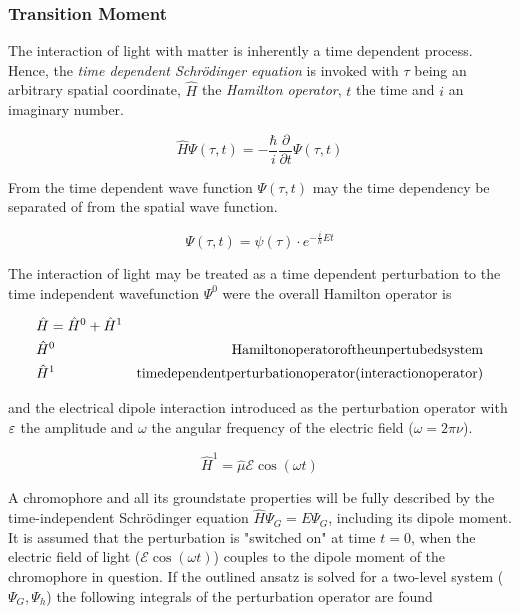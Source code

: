 			\subsubsection{Transition Moment}
			The interaction of light with matter is inherently a time dependent process. Hence, the \emph{time dependent Schrödinger equation} is invoked with $\tau$ being an arbitrary spatial coordinate, $\hat{H}$ the \emph{Hamilton operator}, $t$ the time and $i$ an imaginary number.

			\begin{equation}
				\hat{H}\Psi(\tau, t) = -\frac{\hbar}{i}\frac{\partial}{\partial t}\Psi(\tau, t)
			\end{equation}

			From the time dependent wave function $\Psi(\tau, t)$ may the time dependency be separated of from the spatial wave function.

			\begin{equation}
				\Psi(\tau, t) = \psi(\tau)\cdot e^{-\frac{i}{\hbar} Et}
			\end{equation}

			The interaction of light may be treated as a time dependent perturbation to the time independent wavefunction $\Psi^0$ were the overall Hamilton operator is 

			\begin{equation}
			\begin{split}
				&\hat{H} = \hat{H}^0 + \hat{H}^1 & \\
				&\hat{H}^0 		 	&\mathrm{Hamilton operator of the unpertubed system} \\
				&\hat{H}^1 \hfill	&\mathrm{time dependent perturbation operator (interaction operator)}
			\end{split}
			\end{equation}

			and the electrical dipole interaction introduced as the perturbation operator with ${\large \varepsilon}$ the amplitude and $\omega$ the angular frequency of the electric field ($\omega = 2\pi\nu$). 

			\begin{equation}
				\hat{H}^1 = \hat{\mu}\mathcal{E}\cos(\omega t)
			\end{equation}

			A chromophore and all its groundstate properties will be fully described by the time-independent Schrödinger equation $\hat{H}\Psi_G = E\Psi_G$, including its dipole moment. It is assumed that the perturbation is "switched on" at time $t=0$, when the electric field of light ($\mathcal{E}\cos(\omega t)$) couples to the dipole moment of the chromophore in question. If the outlined ansatz is solved for a two-level system ($\Psi_G, \Psi_h$) the following integrals of the perturbation operator are found

